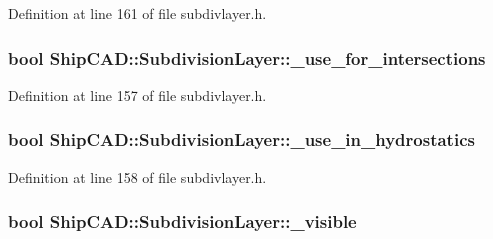 Definition at line 161 of file subdivlayer.\-h.

\hypertarget{classShipCAD_1_1SubdivisionLayer_a8213aa3e02493472fb11949f595446f2}{
\subsubsection[{\-\_\-use\-\_\-for\-\_\-intersections}]{\setlength{\rightskip}{0pt plus 5cm}bool Ship\-C\-A\-D\-::\-Subdivision\-Layer\-::\-\_\-use\-\_\-for\-\_\-intersections\hspace{0.3cm}{\ttfamily [protected]}}}\label{classShipCAD_1_1SubdivisionLayer_a8213aa3e02493472fb11949f595446f2}


Definition at line 157 of file subdivlayer.\-h.

\hypertarget{classShipCAD_1_1SubdivisionLayer_ad36d65882f0c46ff1b3ced7d48c173f4}{
\subsubsection[{\-\_\-use\-\_\-in\-\_\-hydrostatics}]{\setlength{\rightskip}{0pt plus 5cm}bool Ship\-C\-A\-D\-::\-Subdivision\-Layer\-::\-\_\-use\-\_\-in\-\_\-hydrostatics\hspace{0.3cm}{\ttfamily [protected]}}}\label{classShipCAD_1_1SubdivisionLayer_ad36d65882f0c46ff1b3ced7d48c173f4}


Definition at line 158 of file subdivlayer.\-h.

\hypertarget{classShipCAD_1_1SubdivisionLayer_a2d606476aba40bbbfc115c449f46ac26}{
\subsubsection[{\-\_\-visible}]{\setlength{\rightskip}{0pt plus 5cm}bool Ship\-C\-A\-D\-::\-Subdivision\-Layer\-::\-\_\-visible\hspace{0.3cm}{\ttfamily [protected]}}}\label{classShipCAD_1_1SubdivisionLayer_a2d606476aba40bbbfc115c449f46ac26}


